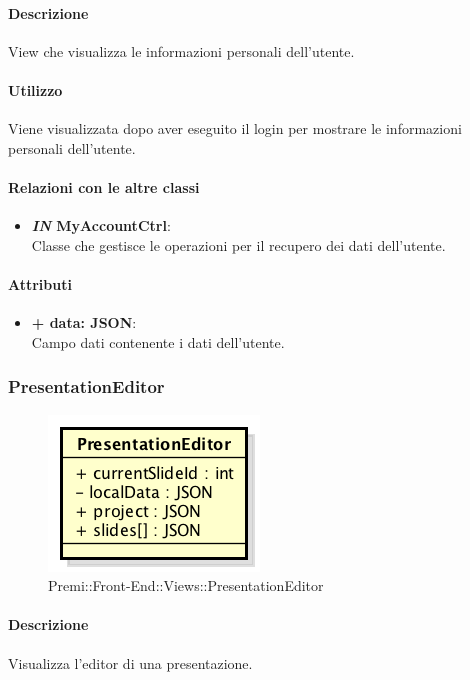 	\paragraph{Descrizione}
	View che visualizza le informazioni personali dell'utente.
	
	\paragraph{Utilizzo}
	Viene visualizzata dopo aver eseguito il login per mostrare le informazioni personali dell'utente.
	
	\paragraph{Relazioni con le altre classi}
	\begin{itemize}
		\item \textbf{\textit{IN} MyAccountCtrl}:\\
		Classe che gestisce le operazioni per il recupero dei dati dell'utente.
	\end{itemize}
	
	\paragraph{Attributi}
	\begin{itemize}
		\item \textbf{+ data: JSON}:\\
		Campo dati contenente i dati dell'utente.
	\end{itemize}
	
	
\subsubsection{PresentationEditor}
	\begin{figure}[h]
		\centering
		\includegraphics[width=0.3\linewidth]{img/premi_front_end_views_presentationeditor}
		\caption[Premi::Front-End::Views::PresentationEditor]{Premi::Front-End::Views::PresentationEditor}
	\end{figure}
	
	\paragraph{Descrizione}
	Visualizza l'editor di una presentazione.
	
